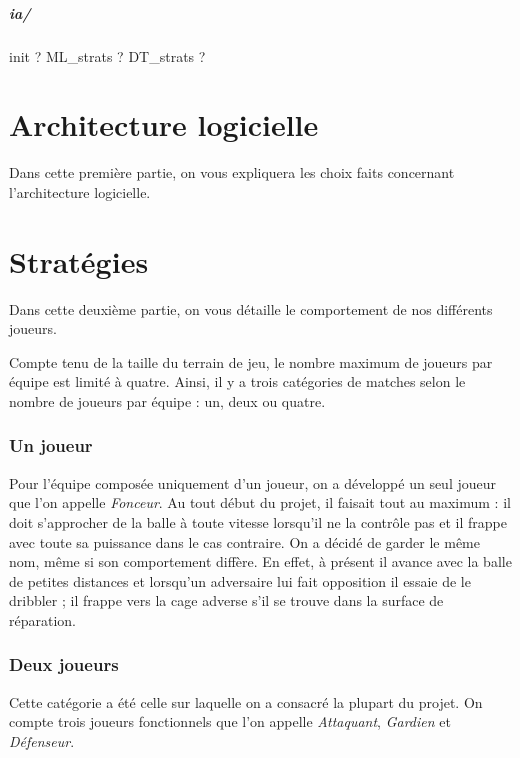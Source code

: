 \documentclass[12pt,a4paper]{article}
\begin{document}
\subsubsection*{ia/}
init ? ML\_strats ? DT\_strats ? 

\newpage

\part{Architecture logicielle} %
Dans cette premi\`ere partie, on vous expliquera les choix faits 
concernant l'architecture logicielle.

\newpage

\part{Strat\'egies}
Dans cette deuxi\`eme partie, on vous d\'etaille le comportement de nos 
diff\'erents joueurs.

Compte tenu de la taille du terrain de jeu, le nombre maximum de joueurs par 
\'equipe est limit\'e \`a quatre. Ainsi, il y a trois cat\'egories de matches 
selon le nombre de joueurs par \'equipe : un, deux ou quatre.

\section*{Un joueur}
Pour l'\'equipe compos\'ee uniquement d'un joueur, on a d\'evelopp\'e un seul 
joueur que l'on appelle {\itshape Fonceur}. Au tout d\'ebut du 
projet, il faisait tout au maximum : il doit 
s'approcher de la balle \`a toute vitesse lorsqu'il ne la contr\^ole pas et il 
frappe avec toute sa puissance dans le cas contraire. On a d\'ecid\'e de garder le 
m\^eme nom, m\^eme si son comportement diff\`ere. En effet, \`a pr\'esent il 
avance avec la balle de petites distances et lorsqu'un adversaire lui fait 
opposition il essaie de le dribbler ; il frappe vers la cage adverse s'il se 
trouve dans la surface de r\'eparation. 

\section*{Deux joueurs}
Cette cat\'egorie a \'et\'e celle sur laquelle on a consacr\'e la plupart du 
projet. On compte trois joueurs fonctionnels que l'on appelle 
{\itshape Attaquant}, {\itshape Gardien} et {\itshape D\'efenseur}. 
\end{document}
